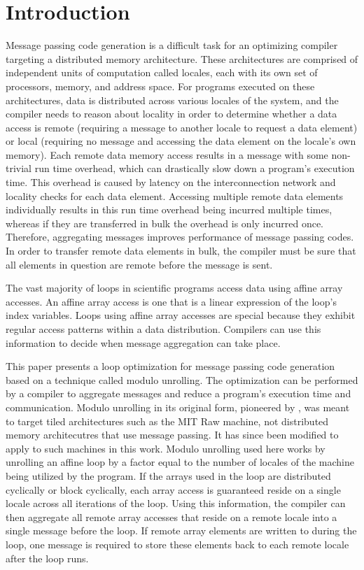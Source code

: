 \section{Introduction}\label{sec:intro} 

Message passing code generation is a difficult task for an optimizing compiler targeting a distributed memory architecture. These architectures are comprised of independent units of computation called locales, each with its own set of processors, memory, and address space. For programs executed on these architectures, data is distributed across various locales of the system, and the compiler needs to reason about locality in order to determine whether a data access is remote (requiring a message to another locale to request a data element) or local (requiring no message and accessing the data element on the locale's own memory). Each remote data memory access results in a message with some non-trivial run time overhead, which can drastically slow down a program's execution time. This overhead is caused by latency on the interconnection network and locality checks for each data element. Accessing multiple remote data elements individually results in this run time overhead being incurred multiple times, whereas if they are transferred in bulk the overhead is only incurred once. Therefore, aggregating messages improves performance of message passing codes. In order to transfer remote data elements in bulk, the compiler must be sure that all elements in question are remote before the message is sent.  

The vast majority of loops in scientific programs access data using affine array accesses. An affine array access is one that is a linear expression of the loop's index variables. Loops using affine array accesses are special because they exhibit regular access patterns within a data distribution. Compilers can use this information to decide when message aggregation can take place. 

This paper presents a loop optimization for message passing code generation based on a technique called modulo unrolling. The optimization can be performed by a compiler to aggregate messages and reduce a program's execution time and communication. Modulo unrolling in its original form, pioneered by \cite{barua1999maps}, was meant to target tiled architectures such as the MIT Raw machine, not distributed memory architecutres that use message passing. It has since been modified to apply to such machines in this work. Modulo unrolling used here works by unrolling an affine loop by a factor equal to the number of locales of the machine being utilized by the program. If the arrays used in the loop are distributed cyclically or block cyclically, each array access is guaranteed reside on a single locale across all iterations of the loop. Using this information, the compiler can then aggregate all remote array accesses that reside on a remote locale into a single message before the loop. If remote array elements are written to during the loop, one message is required to store these elements back to each remote locale after the loop runs. 

